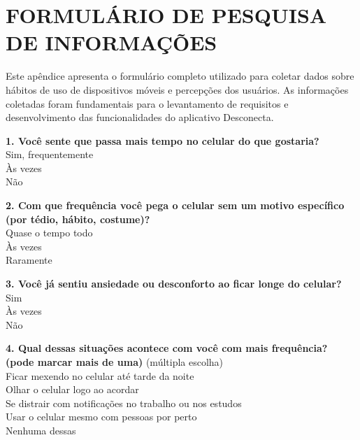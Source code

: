 \chapter{FORMULÁRIO DE PESQUISA DE INFORMAÇÕES}
\label{ap:formulario}

Este apêndice apresenta o formulário completo utilizado para coletar dados sobre hábitos de uso de dispositivos móveis e percepções dos usuários. As informações coletadas foram fundamentais para o levantamento de requisitos e desenvolvimento das funcionalidades do aplicativo Desconecta.

\begin{questionframe}

\textbf{1. Você sente que passa mais tempo no celular do que gostaria?}\\
\opcao Sim, frequentemente\\
\opcao Às vezes\\
\opcao Não

\vspace{0.5cm}

\textbf{2. Com que frequência você pega o celular sem um motivo específico (por tédio, hábito, costume)?}\\
\opcao Quase o tempo todo\\
\opcao Às vezes\\
\opcao Raramente

\vspace{0.5cm}

\textbf{3. Você já sentiu ansiedade ou desconforto ao ficar longe do celular?}\\
\opcao Sim\\
\opcao Às vezes\\
\opcao Não

\vspace{0.5cm}

\textbf{4. Qual dessas situações acontece com você com mais frequência? (pode marcar mais de uma)} (múltipla escolha)\\
\opcao Ficar mexendo no celular até tarde da noite\\
\opcao Olhar o celular logo ao acordar\\
\opcao Se distrair com notificações no trabalho ou nos estudos\\
\opcao Usar o celular mesmo com pessoas por perto\\
\opcao Nenhuma dessas


\end{questionframe}
